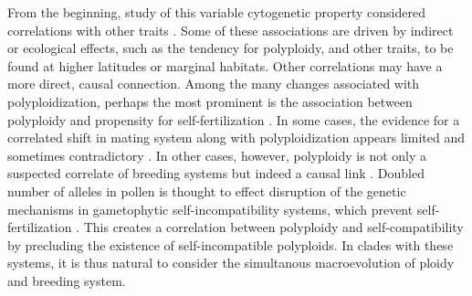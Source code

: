 From the beginning, study of this variable cytogenetic property considered correlations with other traits \citep{stebbins1938}. %
Some of these associations are driven by indirect or ecological effects, such as the tendency for polyploidy, and other traits, to be found at higher latitudes or marginal habitats. %
Other correlations may have a more direct, causal connection.
Among the many changes associated with polyploidization, perhaps the most prominent is the association between polyploidy and propensity for self-fertilization \citep{stebbins1950}. %
In some cases, the evidence for a correlated shift in mating system along with polyploidization appears limited and sometimes contradictory \citep{barringer2007, barrett2008, husband2008}.
In other cases, however, polyploidy is not only a suspected correlate of breeding systems but indeed a causal link \citep{stout1942, lewis1947}.
Doubled number of alleles in pollen is thought to effect disruption of the genetic mechanisms in gametophytic self-incompatibility systems, which prevent self-fertilization \citep{entani1999, tsukamoto2005, kubo2010}. 
This creates a correlation between polyploidy and self-compatibility by precluding the existence of self-incompatible polyploids. %
In clades with these systems, it is thus natural to consider the simultanous macroevolution of ploidy and breeding system.

